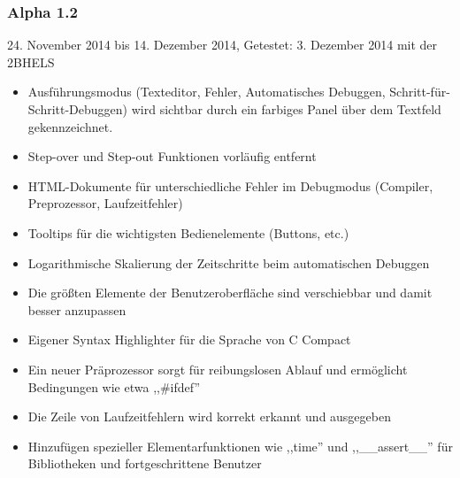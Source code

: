 \subsubsection*{Alpha 1.2}
24. November 2014 bis 14. Dezember 2014,\newline
Getestet: 3. Dezember 2014 mit der 2BHELS
\begin{itemize}
\item Ausführungsmodus (Texteditor, Fehler, Automatisches Debuggen, Schritt-für-Schritt-Debuggen) wird sichtbar durch ein farbiges Panel über dem Textfeld gekennzeichnet.
\item Step-over und Step-out Funktionen vorläufig entfernt
\item HTML-Dokumente für unterschiedliche Fehler im Debugmodus (Compiler, Preprozessor, Laufzeitfehler)
\item Tooltips für die wichtigsten Bedienelemente (Buttons, etc.)
\item Logarithmische Skalierung der Zeitschritte beim automatischen Debuggen
\item Die größten Elemente der Benutzeroberfläche sind verschiebbar und damit besser anzupassen
\item Eigener Syntax Highlighter für die Sprache von C Compact 
\item Ein neuer Präprozessor sorgt für reibungslosen Ablauf und ermöglicht Bedingungen wie etwa ,,\#ifdef''
\item Die Zeile von Laufzeitfehlern wird korrekt erkannt und ausgegeben
\item Hinzufügen spezieller Elementarfunktionen wie ,,time'' und ,,\_\_assert\_\_'' für Bibliotheken und fortgeschrittene Benutzer
\end{itemize}

